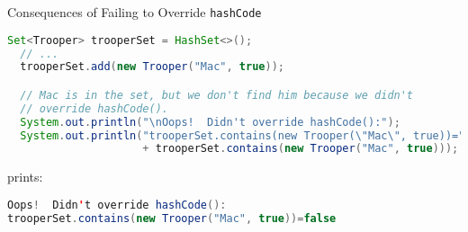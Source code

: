 \documentclass{beamer}
\begin{document}
\begin{frame}[fragile]{Consequences of Failing to Override {\tt hashCode}}

\begin{lstlisting}[language=Java]
  Set<Trooper> trooperSet = HashSet<>();
  // ...
  trooperSet.add(new Trooper("Mac", true));

  // Mac is in the set, but we don't find him because we didn't
  // override hashCode().
  System.out.println("\nOops!  Didn't override hashCode():");
  System.out.println("trooperSet.contains(new Trooper(\"Mac\", true))="
                     + trooperSet.contains(new Trooper("Mac", true)));

\end{lstlisting}
prints:
\begin{lstlisting}[language=Java]
Oops!  Didn't override hashCode():
trooperSet.contains(new Trooper("Mac", true))=false
\end{lstlisting}

\end{frame}







\end{document}
